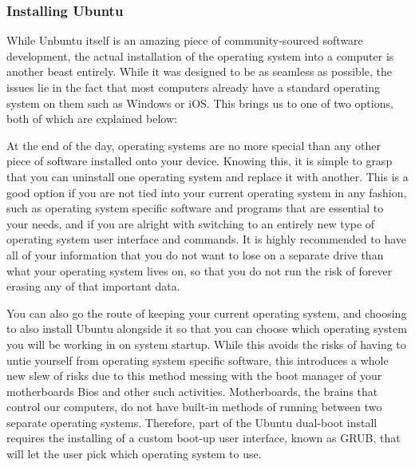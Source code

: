 \documentclass[12pt]{article}
\begin{document}
\subsubsection{Installing Ubuntu}
While Unbuntu itself is an amazing piece of community-sourced software development, the actual installation of the operating system into a computer is another beast entirely. While it was designed to be as seamless as possible, the issues lie in the fact that most computers already have a standard operating system on them such as Windows or iOS. This brings us to one of two options, both of which are explained below:
\begin{description}[font=$\bullet$~\normalfont\scshape\color{red!50!black}]
	\item [Removing the current operating system and replacing it with Ubuntu] At the end of the day, operating systems are no more special than any other piece of software installed onto your device. Knowing this, it is simple to grasp that you can uninstall one operating system and replace it with another. This is a good option if you are not tied into your current operating system in any fashion, such as operating system specific software and programs that are essential to your needs, and if you are alright with switching to an entirely new type of operating system user interface and commands. It is highly recommended to have all of your information that you do not want to lose on a separate drive than what your operating system lives on, so that you do not run the risk of forever erasing any of that important data.
	\item [Installing Ubuntu beside the current operating sytem with dual-boot] You can also go the route of keeping your current operating system, and choosing to also install Ubuntu alongside it so that you can choose which operating system you will be working in on system startup. While this avoids the risks of having to untie yourself from operating system specific software, this introduces a whole new slew of risks due to this method messing with the boot manager of your motherboards Bios and other such activities. Motherboards, the brains that control our computers, do not have built-in methods of running between two separate operating systems. Therefore, part of the Ubuntu dual-boot install requires the installing of a custom boot-up user interface, known as GRUB, that will let the user pick which operating system to use.
\end{description}
\end{document}
